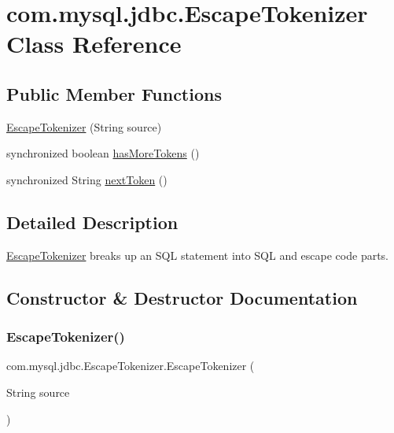 \hypertarget{classcom_1_1mysql_1_1jdbc_1_1_escape_tokenizer}{}\section{com.\+mysql.\+jdbc.\+Escape\+Tokenizer Class Reference}
\label{classcom_1_1mysql_1_1jdbc_1_1_escape_tokenizer}
\subsection*{Public Member Functions}
\begin{DoxyCompactItemize}
\item 
\mbox{\hyperlink{classcom_1_1mysql_1_1jdbc_1_1_escape_tokenizer_a25b0057d91034efa8d509963b07ae176}{Escape\+Tokenizer}} (String source)
\item 
synchronized boolean \mbox{\hyperlink{classcom_1_1mysql_1_1jdbc_1_1_escape_tokenizer_ab1958b29194626c956437ca52ece738d}{has\+More\+Tokens}} ()
\item 
synchronized String \mbox{\hyperlink{classcom_1_1mysql_1_1jdbc_1_1_escape_tokenizer_a7e8d003351dbead32c4b2e81ac5b4e86}{next\+Token}} ()
\end{DoxyCompactItemize}


\subsection{Detailed Description}
\mbox{\hyperlink{classcom_1_1mysql_1_1jdbc_1_1_escape_tokenizer}{Escape\+Tokenizer}} breaks up an S\+QL statement into S\+QL and escape code parts. 

\subsection{Constructor \& Destructor Documentation}
\mbox{\label{classcom_1_1mysql_1_1jdbc_1_1_escape_tokenizer_a25b0057d91034efa8d509963b07ae176}} 
\subsubsection{\texorpdfstring{Escape\+Tokenizer()}{EscapeTokenizer()}}
{\footnotesize\ttfamily com.\+mysql.\+jdbc.\+Escape\+Tokenizer.\+Escape\+Tokenizer (\begin{DoxyParamCaption}\item[{String}]{source }\end{DoxyParamCaption})}

